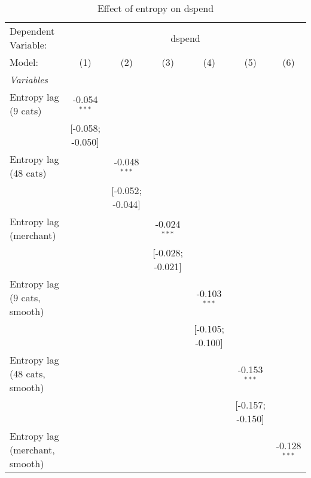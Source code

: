 
\begin{table}[htbp]
   \centering
   \tiny
   \begin{threeparttable}[b]
      \caption{\label{tab:reg_dspend_lag_cnz} Effect of entropy on dspend}
      \begin{tabular}{lcccccc}
         \tabularnewline \midrule \midrule
         Dependent Variable: & \multicolumn{6}{c}{dspend}\\
         Model:                         & (1)              & (2)              & (3)              & (4)              & (5)              & (6)\\  
         \midrule
         \emph{Variables}\\
         Entropy lag (9 cats)           & -0.054$^{***}$   &                  &                  &                  &                  &   \\   
                                        & [-0.058; -0.050] &                  &                  &                  &                  &   \\   
         Entropy lag (48 cats)          &                  & -0.048$^{***}$   &                  &                  &                  &   \\   
                                        &                  & [-0.052; -0.044] &                  &                  &                  &   \\   
         Entropy lag (merchant)         &                  &                  & -0.024$^{***}$   &                  &                  &   \\   
                                        &                  &                  & [-0.028; -0.021] &                  &                  &   \\   
         Entropy lag (9 cats, smooth)   &                  &                  &                  & -0.103$^{***}$   &                  &   \\   
                                        &                  &                  &                  & [-0.105; -0.100] &                  &   \\   
         Entropy lag (48 cats, smooth)  &                  &                  &                  &                  & -0.153$^{***}$   &   \\   
                                        &                  &                  &                  &                  & [-0.157; -0.150] &   \\   
         Entropy lag (merchant, smooth) &                  &                  &                  &                  &                  & -0.128$^{***}$\\   

\end{tabular}
\end{threeparttable}
\end{table}
